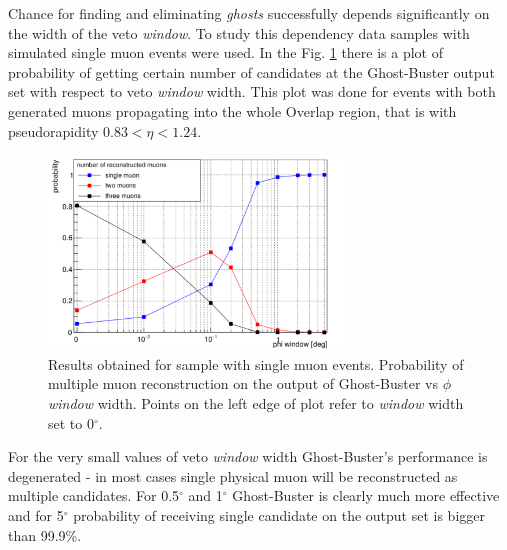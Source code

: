 Chance for finding and eliminating \textit{ghosts} successfully depends significantly on the width of the veto \textit{window}. To study this dependency data samples with simulated single muon events were used. In the Fig. \ref{prob_vs_phi} there is a plot of probability of getting certain number of candidates at the Ghost-Buster output set with respect to veto \textit{window} width. This plot was done for events with both generated muons propagating into the whole Overlap region, that is with pseudorapidity $0.83 < \eta < 1.24$.
\begin{figure}[t]
\centering
\includegraphics[width=0.7\textwidth]{prob_phi.pdf}
\caption{Results obtained for sample with single muon events. Probability of multiple muon reconstruction on the output of Ghost-Buster vs $\phi$ \textit{window} width. Points on the left edge of plot refer to \textit{window} width set to 0$^\circ$. }
\label{prob_vs_phi}
\end{figure} 
For the very small values of veto \textit{window} width Ghost-Buster's performance is degenerated - in most cases single physical muon will be reconstructed as multiple candidates. For 0.5$^\circ$\textrm{ }and 1$^\circ$\textrm{ }Ghost-Buster is clearly much more effective and for 5$^\circ$\textrm{ }probability of receiving single candidate on the output set is bigger than 99.9\%. 

